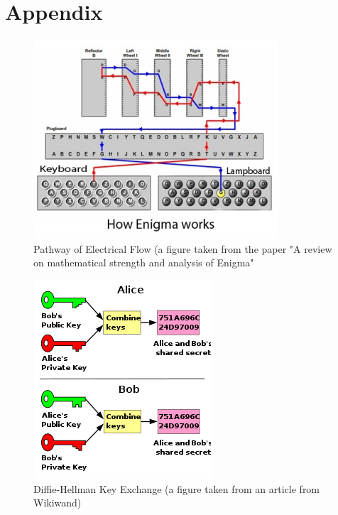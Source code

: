 \documentclass[conference,compsoc]{IEEEtran}
\begin{document}
\section{Appendix}
\begin{figure}[h!]
    \centering
    \includegraphics[scale = .9]{pathway.png}
    \caption{Pathway of Electrical Flow (a figure taken from the paper "A review on mathematical strength and analysis of Enigma"}
    \label{fig:path}
\end{figure}
\begin{figure}[h!]
    \centering
    \includegraphics[scale = .7]{dh-graph.png}
    \caption{Diffie-Hellman Key Exchange (a figure taken from an article from Wikiwand)}
    \label{fig:dh}
\end{figure}
\end{document}

